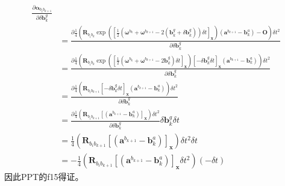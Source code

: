 \documentclass[oneside]{article}
\begin{document}
\begin{align}
    \frac{\partial \boldsymbol{\alpha}_{b_{i} b_{k+1}}}{\partial \delta \mathbf{b}_{k}^{g}}    \\
 &= \frac{\partial\frac{1}{4}\left(\mathbf{R}_{b_{i} b_{k}}
\exp \left( \left[ \frac{1}{2}(\mathbf{\omega}^{b_k} + \mathbf{\omega}^{b_{k + 1}} - 2(\mathbf{b}_k^g + \delta \mathbf{b}_k^g))\delta t \right]_{\mathbf{x}}\right)
 \left({\mathbf{a}}^{b_{k+1}}-\mathbf{b}_{k}^{a}\right)-\mathbf{O} \right)   \delta t^2}{\partial \delta \mathbf{b}_{k}^{g}} \\
 &= \frac{\partial\frac{1}{4}\left(\mathbf{R}_{b_{i} b_{k}}
 \exp \left( \left[ \frac{1}{2}(\mathbf{\omega}^{b_k} + \mathbf{\omega}^{b_{k + 1}} - 2\mathbf{b}_k^g ) \delta t\right]_{\mathbf{x}}\right)
 \left[-\delta \mathbf{b}_k^g \delta t \right]_\mathbf{x}
  \left({\mathbf{a}}^{b_{k+1}}-\mathbf{b}_{k}^{a}\right) \right)   \delta t^2}{\partial \delta \mathbf{b}_{k}^{g}} \\
&= \frac{\partial\frac{1}{4}\left(\mathbf{R}_{b_{i} b_{k+1}}
  \left[-\delta \mathbf{b}_k^g \delta t \right]_\mathbf{x}
   \left({\mathbf{a}}^{b_{k+1}}-\mathbf{b}_{k}^{a}\right) \right)   \delta t^2}{\partial \delta \mathbf{b}_{k}^{g}}  \\
&= \frac{\partial\frac{1}{4}\left(\mathbf{R}_{b_{i} b_{k+1}}
   \left[ \left({\mathbf{a}}^{b_{k+1}}-\mathbf{b}_{k}^{a}\right) \right]_\mathbf{x}
     \right)   \delta t^2}{\partial \delta \mathbf{b}_{k}^{g}}    
    \delta \mathbf{b}_k^g \delta t \\
&= \frac{1}{4}\left(\mathbf{R}_{b_{i} b_{k+1}}
    \left[ \left({\mathbf{a}}^{b_{k+1}}-\mathbf{b}_{k}^{a}\right) \right]_\mathbf{x}
      \right)   \delta t^2  \delta t  \\
&=-\frac{1}{4}\left(\mathbf{R}_{b_{i} b_{k+1}}\left[\left(\mathbf{a}^{b_{k+1}}-\mathbf{b}_{k}^{a}\right)\right]_{\mathbf{x}} \delta t^{2}\right)(-\delta t)
\end{align} 
因此PPT的f15得证。
\end{document}
